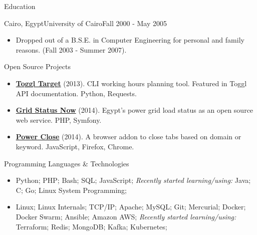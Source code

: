 \documentclass[]{mosabcv}
\begin{document}
\begin{cvsection}{Education}
  \begin{cvsubsection}{Cairo, Egypt}{University of Cairo}{Fall 2000 - May 2005}
    \begin{itemize}
      \item Dropped out of a B.S.E. in Computer Engineering for personal and family reasons. (Fall 2003 - Summer 2007).
    \end{itemize}
  \end{cvsubsection}
\end{cvsection}

\begin{cvsection}{Open Source Projects}
  \begin{cvsubsection}{}{}{}
    \begin{itemize}
      \item \textbf{\href{https://github.com/mos3abof/toggl_target}{Toggl Target}} (2013). CLI working hours planning tool. Featured in Toggl API documentation. Python, Requests.
      \item \textbf{\href{https://www.gridstatusnow.com}{Grid Status Now}} (2014). Egypt's power grid load status as an open source web service. PHP, Symfony.
      \item \textbf{\href{https://power-close.com/}{Power Close}} (2014). A browser addon to close tabs based on domain or keyword. JavaScript, Firefox, Chrome.
    \end{itemize}
  \end{cvsubsection}
\end{cvsection}

\begin{cvsection}{Programming Languages \& Technologies}
  \begin{cvsubsection}{}{}{}
    \begin{itemize}
      \item Python; PHP; Bash; SQL; JavaScript; \textit{Recently started learning/using:} Java; C; Go; Linux System Programming;
      \item Linux; Linux Internals; TCP/IP; Apache; MySQL; Git; Mercurial; Docker; Docker Swarm; Ansible; Amazon AWS; \textit{Recently started learning/using:} Terraform; Redis; MongoDB; Kafka; Kubernetes;
    \end{itemize}
  \end{cvsubsection}
\end{cvsection}
\end{document}

